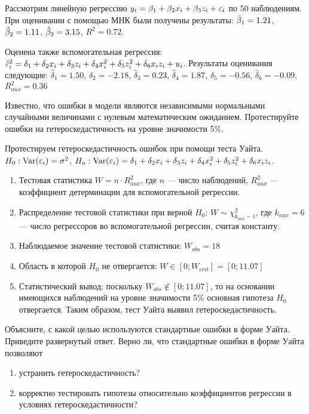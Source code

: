 \documentclass[pdftex,11pt,openany]{book}\usepackage[]{graphicx}\usepackage[]{color}
\begin{document}
\begin{problem}
Рассмотрим линейную регрессию $y_i = \beta_1 + \beta_2 x_i + \beta_3 z_i + \varepsilon_i$ по 50 наблюдениям. При оценивании с помощью МНК были получены результаты: $\hat{\beta}_1=1.21$, $\hat{\beta}_2=1.11$, $\hat{\beta}_3=3.15$, $R^2=0.72$.

Оценена также вспомогательная регрессия: $\hat{\varepsilon}^2_i=\delta_1+\delta_2 x_i +\delta_3 z_i+\delta_4 x_i^2+\delta_5 z_i^2+\delta_6 x_i z_i + u_i$. Результаты оценивания следующие: $\hat{\delta}_1=1.50$, $\hat{\delta}_2=-2.18$,  $\hat{\delta}_3=0.23$,  $\hat{\delta}_4=1.87$,  $\hat{\delta}_5=-0.56$,  $\hat{\delta}_6=-0.09$,  $R^2_{aux}=0.36$ 


Известно, что ошибки в модели являются независимыми нормальными случайными величинами с нулевым математическим ожиданием. Протестируйте
ошибки на гетероскедастичность на уровне значимости 5\%.
\end{problem}

\begin{solution}
Протестируем гетероскедастичность ошибок при помощи теста Уайта. $H_0: \operatorname{Var}(\varepsilon_i)=\sigma^2$, $H_a: \operatorname{Var}(\varepsilon_i)=\delta_1+\delta_2 x_i +\delta_3 z_i+\delta_4 x_i^2+\delta_5 z_i^2+\delta_6 x_i z_i$.
\begin{enumerate}
\item Тестовая статистика $W=n\cdot R^2_{aux}$, где $n$ --- число наблюдений, $R^2_{aux}$ --- коэффициент детерминации для вспомогательной регрессии.
\item Распределение тестовой статистики при верной $H_0$: $W\sim \chi^2_{k_{aux}-1}$, где $k_{aux}=6$ --- число регрессоров во вспомогательной регрессии, считая константу.
\item Наблюдаемое значение тестовой статистики: $W_{obs}=18$
\item Область в которой $H_0$ не отвергается: $W\in [0;W_{crit}]=[0;11.07]$
\item Статистический вывод: поскольку $W_{obs} \notin [0;11.07]$, то на основании имеющихся наблюдений на уровне значимости 5\% основная гипотеза $H_0$ отвергается. Таким образом, тест Уайта выявил гетероскедастичность.
\end{enumerate}
\end{solution}



\begin{problem}
Объясните, с какой целью используются стандартные ошибки в форме Уайта. Приведите развернутый ответ. Верно ли, что стандартные ошибки в форме Уайта позволяют
\begin{enumerate}
\item устранить гетероскедастичность?
\item корректно тестировать гипотезы относительно коэффициентов регрессии в условиях гетероскедастичности? 
\end{enumerate}
\end{problem}
\end{document}
